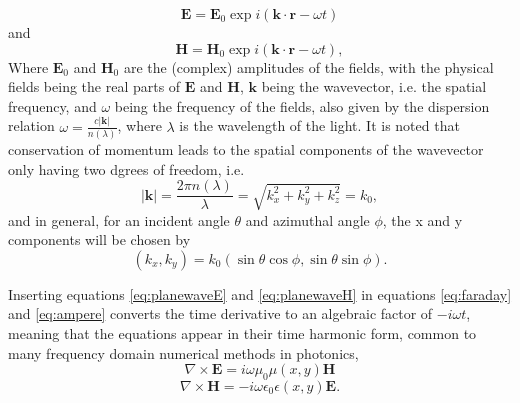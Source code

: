 \begin{equation}
\label{eq:planewaveE}
\mathbf{E} = \mathbf{E}_0 \exp{i(\mathbf{k}\cdot\mathbf{r} - \omega t)}
\end{equation}
and
\begin{equation}
\label{eq:planewaveH}
\mathbf{H} = \mathbf{H}_0 \exp{i(\mathbf{k}\cdot\mathbf{r} - \omega t)},
\end{equation}
Where $\mathbf{E}_0$ and $\mathbf{H}_0$ are the (complex) amplitudes of the fields, with the physical fields being the real parts of
$\mathbf{E}$ and $\mathbf{H}$, $\mathbf{k}$ being the wavevector, i.e. the spatial frequency, and $\omega$ being the frequency of the fields, also given by the dispersion relation
$\omega = \frac{c|\mathbf{k}|}{n(\lambda)}$, where $\lambda$ is the wavelength of the light.
It is noted that conservation of momentum leads to the spatial components of the wavevector only having two dgrees of freedom, i.e.
\begin{equation}
\label{eq:dispersionk}
|\mathbf{k}| = \frac{2\pi n(\lambda)}{\lambda} = \sqrt{k_x^2+k_y^2+k_z^2} = k_0,
\end{equation}
and in general, for an incident angle $\theta$ and azimuthal angle $\phi$, the x and y components will be chosen by
\begin{equation}
\label{eq:inc_ang_k}
(k_x,k_y) = k_0(\sin{\theta}\cos{\phi},\sin{\theta}\sin{\phi}).
\end{equation}

Inserting equations \ref{eq:planewaveE} and \ref{eq:planewaveH} in equations \ref{eq:faraday} and \ref{eq:ampere} converts the time derivative to
an algebraic factor of $-i\omega t$, meaning that the equations appear in their time harmonic form, common to many frequency domain numerical methods in photonics,
\begin{equation}
\label{eq:THfaraday}
\nabla \times \mathbf{E} = i\omega\mu_0\mu(x,y)\mathbf{H}
\end{equation}
\begin{equation}
\label{eq:THampere}
\nabla \times \mathbf{H} = -i\omega\epsilon_0\epsilon(x,y)\mathbf{E}.
\end{equation}



